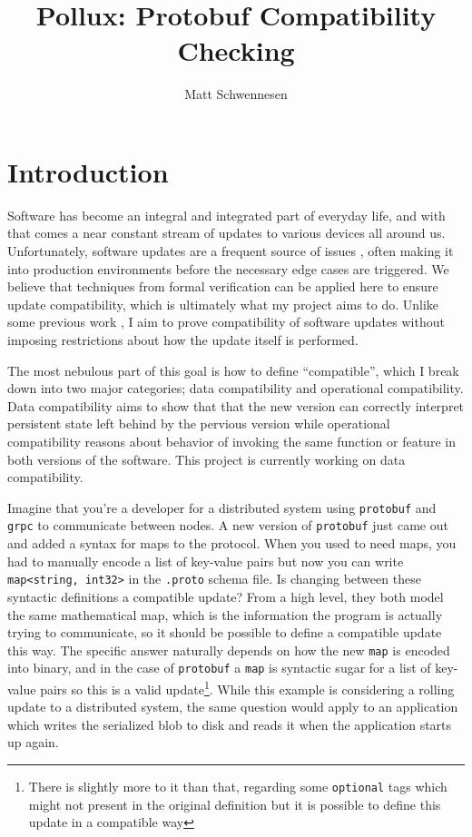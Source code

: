\documentclass[11pt]{article}
\author{Matt Schwennesen}
\title{Pollux: Protobuf Compatibility Checking}
\date{}
\theoremstyle{definition}
\theoremstyle{plain}
\begin{document}
\maketitle
\tableofcontents

\section{Introduction}

Software has become an integral and integrated part of everyday life, and with
that comes a near constant stream of updates to various devices all around
us. Unfortunately, software updates are a frequent source of issues
\autocites{zhangUnderstandingDetectingSoftware2021}[][]{Gray1986WhyDC}, often
making it into production environments before the necessary edge cases are
triggered. We believe that techniques from formal verification can be applied
here to ensure update compatibility, which is ultimately what my project aims to
do. Unlike some previous work
\autocites{ajmaniModularSoftwareUpgrades2006}[][]{reitblattAbstractionsNetworkUpdate2012},
I aim to prove compatibility of software updates without imposing restrictions
about how the update itself is performed.

The most nebulous part of this goal is how to define ``compatible'', which I
break down into two major categories; data compatibility and operational
compatibility. Data compatibility aims to show that that the new version can
correctly interpret persistent state left behind by the pervious version while
operational compatibility reasons about behavior of invoking the same function
or feature in both versions of the software. This project is currently working
on data compatibility.

Imagine that you're a developer for a distributed system using \texttt{protobuf}
and \texttt{grpc} to communicate between nodes. A new version of
\texttt{protobuf} just came out and added a syntax for maps to the
protocol. When you used to need maps, you had to manually encode a list of
key-value pairs but now you can write \texttt{map<string, int32>} in the
\texttt{.proto} schema file. Is changing between these syntactic definitions a
compatible update? From a high level, they both model the same mathematical map,
which is the information the program is actually trying to communicate, so it
should be possible to define a compatible update this way. The specific answer
naturally depends on how the new \texttt{map} is encoded into binary, and in the
case of \texttt{protobuf} a \texttt{map} is syntactic sugar for a list of
key-value pairs so this is a valid update\footnote{There is slightly more to it
	than that, regarding some \texttt{optional} tags which might not present in
	the original definition but it is possible to define this update in a
	compatible way}. While this example is considering a rolling update to a
distributed system, the same question would apply to an application which writes
the serialized blob to disk and reads it when the application starts up again.
\end{document}
